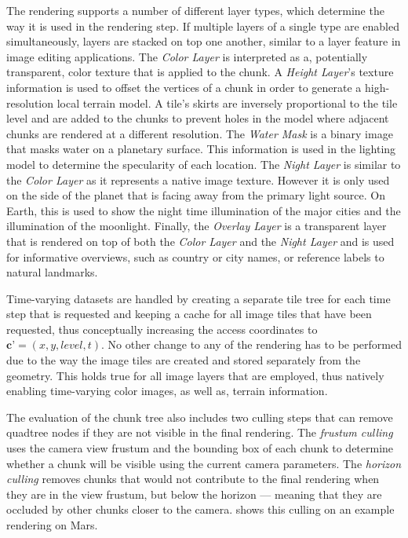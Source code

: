The rendering supports a number of different layer types, which determine the way it is used in the rendering step.  If multiple layers of a single type are enabled simultaneously, layers are stacked on top one another, similar to a layer feature in image editing applications.  The \emph{Color Layer} is interpreted as a, potentially transparent, color texture that is applied to the chunk.  A \emph{Height Layer}'s texture information is used to offset the vertices of a chunk in order to generate a high-resolution  local terrain model.  A tile's skirts are inversely proportional to the tile level and are added to the chunks to prevent holes in the model where adjacent chunks are rendered at a different resolution.  The \emph{Water Mask} is a binary image that masks water on a planetary surface.  This information is used in the lighting model to determine the specularity of each location.  The \emph{Night Layer} is similar to the \emph{Color Layer} as it represents a native image texture.  However it is only used on the side of the planet that is facing away from the primary light source.  On Earth, this is used to show the night time illumination of the major cities and the illumination of the moonlight.  Finally, the \emph{Overlay Layer} is a transparent layer that is rendered on top of both the \emph{Color Layer} and the \emph{Night Layer} and is used for informative overviews, such as country or city names, or reference labels to natural landmarks.

Time-varying datasets are handled by creating a separate tile tree for each time step that is requested and keeping a cache for all image tiles that have been requested, thus conceptually increasing the access coordinates to $\textbf{c'} = (x,y,level,t)$.  No other change to any of the rendering has to be performed due to the way the image tiles are created and stored separately from the geometry.  This holds true for all image layers that are employed, thus natively enabling time-varying color images, as well as, terrain information.

The evaluation of the chunk tree also includes two culling steps that can remove quadtree nodes if they are not visible in the final rendering.  The \emph{frustum culling} uses the camera view frustum and the bounding box of each chunk to determine whether a chunk will be visible using the current camera parameters.  The \emph{horizon culling} removes chunks that would not contribute to the final rendering when they are in the view frustum, but below the horizon --- meaning that they are occluded by other chunks closer to the camera.   shows this culling on an example rendering on Mars.

